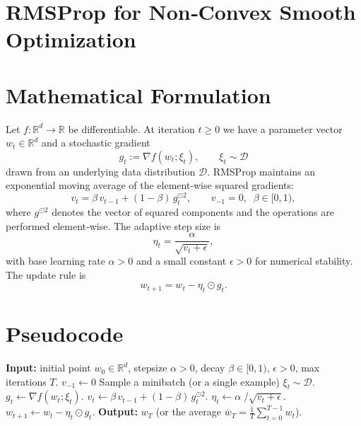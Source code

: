 \documentclass{article}
\newcommand{\R}{\mathbb{R}}
\begin{document}
\section*{RMSProp for Non‑Convex Smooth Optimization}

\section*{Mathematical Formulation}
Let $f:\R^{d}\rightarrow\R$ be differentiable.  
At iteration $t\ge 0$ we have a parameter vector $w_t\in\R^{d}$ and a stochastic gradient 
\[
g_t:=\nabla f(w_t;\xi_t),\qquad \xi_t\sim \mathcal{D}
\]
drawn from an underlying data distribution $\mathcal{D}$.  
RMSProp maintains an exponential moving average of the element‑wise squared gradients:
\begin{equation}
v_t = \beta\, v_{t-1} + (1-\beta)\, g_t^{\odot 2},
\qquad v_{-1}=0,\;\; \beta\in[0,1),
\tag{1}
\end{equation}
where $g^{\odot 2}$ denotes the vector of squared components and the operations are
performed element‑wise.  
The adaptive step size is
\begin{equation}
\eta_t = \frac{\alpha}{\sqrt{v_t+\epsilon}},
\tag{2}
\end{equation}
with base learning rate $\alpha>0$ and a small constant $\epsilon>0$ for numerical stability.  
The update rule is
\begin{equation}
w_{t+1}= w_t - \eta_t\odot g_t .
\tag{3}
\end{equation}

\section*{Pseudocode}
\begin{algorithm}[H]
\caption{RMSProp (non‑convex version)}
\begin{algorithmic}[1]
\State \textbf{Input:} initial point $w_0\in\R^{d}$, stepsize $\alpha>0$, decay $\beta\in[0,1)$, $\epsilon>0$, max iterations $T$.
\State $v_{-1}\gets 0$ 
    \State Sample a minibatch (or a single example) $\xi_t\sim\mathcal{D}$.
    \State $g_t \gets \nabla f(w_t;\xi_t)$.
    \State $v_t \gets \beta\, v_{t-1} + (1-\beta)\, g_t^{\odot 2}$.
    \State $\eta_t \gets \alpha\; \big/ \sqrt{v_t+\epsilon}$.
    \State $w_{t+1} \gets w_t - \eta_t\odot g_t$.
\EndFor
\State \textbf{Output:} $w_T$ (or the average $\bar w_T=\frac1T\sum_{t=0}^{T-1}w_t$).
\end{algorithmic}
\end{algorithm}
\end{document}
